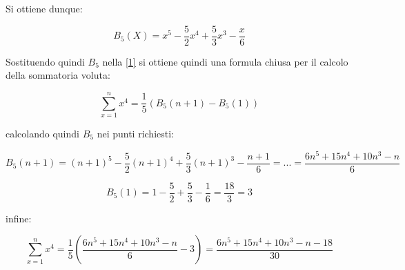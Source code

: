 \documentclass{article}
\begin{document}
Si ottiene dunque: 

$$B_5(X) = x^5 - \frac{5}{2}x^4 + \frac{5}{3}x^3 - \frac{x}{6}$$

Sostituendo quindi $B_5$ nella \ref{1} si ottiene quindi una formula chiusa per il calcolo della sommatoria voluta: 

$$\sum_{x=1}^{n}{x^4} = \frac{1}{5}(B_5(n+1) - B_5(1))$$

calcolando quindi $B_5$ nei punti richiesti: 

$$B_5(n+1) = (n+1)^5 - \frac{5}{2}(n+1)^4 + \frac{5}{3}(n+1)^3 - \frac{n+1}{6} =  ... = \frac{6n^5+15n^4+10n^3-n}{6}$$

$$B_5(1) = 1 - \frac{5}{2} + \frac{5}{3} - \frac{1}{6} = \frac{18}{3} = 3$$

infine:

$$\sum_{x=1}^{n}{x^4} = \frac{1}{5}(\frac{6n^5+15n^4+10n^3-n}{6}-3)=\frac{6n^5+15n^4+10n^3-n-18}{30}$$
\end{document}
